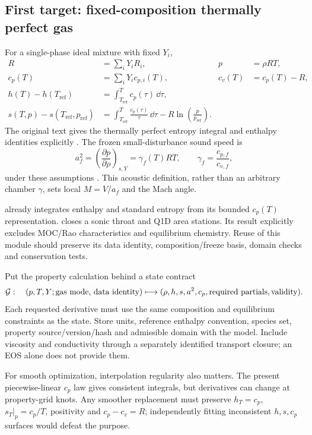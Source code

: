 \subsection{First target: fixed-composition thermally perfect gas}
For a single-phase ideal mixture with fixed \(Y_i\),
\begin{align}
R &= \sum_iY_i R_i, & p&=\rho RT,\\
c_p(T)&=\sum_iY_i c_{p,i}(T),&
c_v(T)&=c_p(T)-R,\\
h(T)-h(T_{\mathrm{ref}})
&=\int_{T_{\mathrm{ref}}}^{T}c_p(\tau)\,\dd\tau,\\
s(T,p)-s(T_{\mathrm{ref}},p_{\mathrm{ref}})
&=\int_{T_{\mathrm{ref}}}^{T}\frac{c_p(\tau)}{\tau}\,\dd\tau
-R\ln\!\left(\frac{p}{p_{\mathrm{ref}}}\right).
\end{align}
The original text gives the thermally perfect entropy integral and
enthalpy identities explicitly \cite[\S1.4.5, PDF pp.~40--44,
Eqs.~1.18, 1.20, 1.32--1.35; \S17.4, PDF p.~678]{anderson}.
The frozen small-disturbance sound speed is
\begin{equation}
a_f^2=\left(\frac{\partial p}{\partial\rho}\right)_{s,Y}
=\gamma_f(T)RT,\qquad
\gamma_f=\frac{c_{p,f}}{c_{v,f}},
\end{equation}
under these assumptions \cite[\S17.5, PDF p.~682, Eq.~17.36]{anderson}.
This acoustic definition, rather than an arbitrary chamber \(\gamma\),
sets local \(M=V/a_f\) and the Mach angle.

\current {} already integrates enthalpy and
standard entropy from its bounded \(c_p(T)\) representation.
 closes a sonic throat and Q1D area
stations. Its result explicitly excludes MOC/Rao characteristics and
equilibrium chemistry. Reuse of this module should preserve its data
identity, composition/freeze basis, domain checks and conservation tests.

\proposal Put the property calculation behind a state contract
\[
\mathcal{G}:\quad
(p,T,Y;\hbox{gas mode, data identity})
\longmapsto
(\rho,h,s,a^2,c_p,\hbox{required partials},\hbox{validity}).
\]
Each requested derivative must use the same composition and equilibrium
constraints as the state. Store units, reference enthalpy convention,
species set, property source/version/hash and admissible domain with
the model. Include viscosity and conductivity through a separately
identified transport closure; an EOS alone does not provide them.

For smooth optimization, interpolation regularity also matters. The
present piecewise-linear \(c_p\) law gives consistent integrals, but
derivatives can change at property-grid knots. Any smoother replacement
must preserve \(h_T=c_p\), \(s_T|_p=c_p/T\), positivity and
\(c_p-c_v=R\); independently fitting inconsistent \(h,s,c_p\) surfaces
would defeat the purpose.

